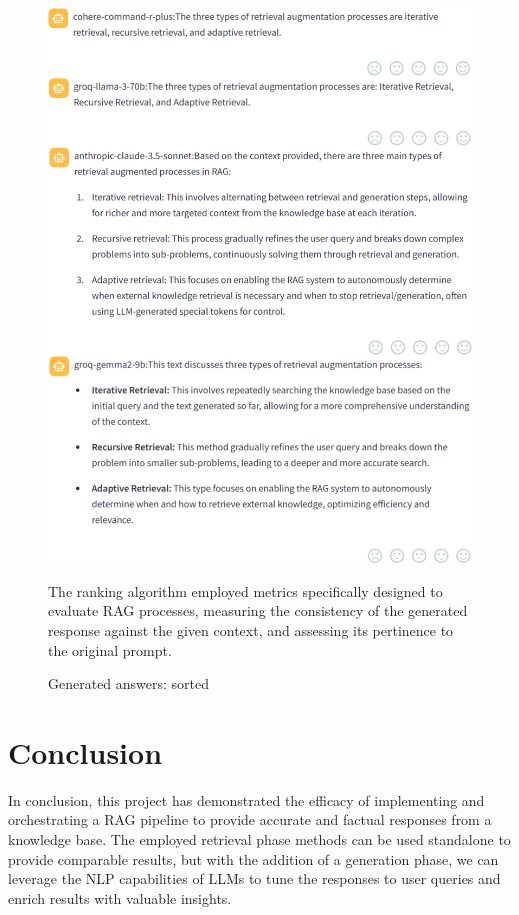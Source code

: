 \begin{figure}[H]
    \centering
    \includegraphics[width=\linewidth]{./figures/app-answers-sorted.png}
    \caption{Generated answers: sorted}
    \begin{flushleft}
        The ranking algorithm employed metrics specifically designed to evaluate RAG processes, measuring the consistency of the generated response against the given context, and assessing its pertinence to the original prompt.
    \end{flushleft}
\end{figure}

\section{Conclusion}
In conclusion, this project has demonstrated the efficacy of implementing and orchestrating a RAG pipeline to provide accurate and factual responses from a knowledge base. The employed retrieval phase methods can be used standalone to provide comparable results, but with the addition of a generation phase, we can leverage the NLP capabilities of LLMs to tune the responses to user queries and enrich results with valuable insights.